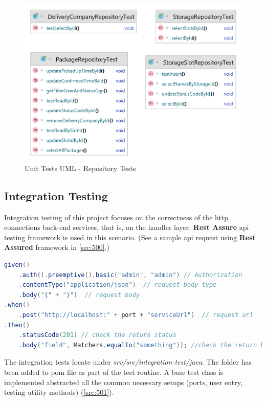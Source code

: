\begin{figure}[H]
    \centering
    \includegraphics[width=1\linewidth]{images/test/repository_tests_white.png}
    \caption{Unit Tests UML - Repository Tests}
    \label{fig:ut_uml_repo}
\end{figure}


\subsection{Integration Testing}
\label{subsec:test-api}

Integration testing of this project focuses on the correctness of the http connections back-end services, that is, on the handler layer. \textbf{Rest Assure} \cite{test-rest-asstured} api testing framework is used in this scenario. (See a sample api request using \textbf{Rest Assured} framework in \autoref{src:500}.)

\bigskip
{}
\begin{lstlisting}[language={java}]
given()  
	.auth().preemptive().basic("admin", "admin") // Authorization
	.contentType("application/json")  // request body type
	.body("{" + "}")  // request body
.when()  
	.post("http://localhost:" + port + "serviceUrl")  // request url
.then()  
	.statusCode(201) // check the return status
	.body("field", Matchers.equalTo("something")); //check the return body
\end{lstlisting}

The integration tests locate under \textit{srv/src/integration-test/java}. The folder has been added to pom file as part of the test routine. A base test class is implemented abstracted all the common necessary setups (ports, user entry, testing utility methods) (\autoref{src:501}). 

